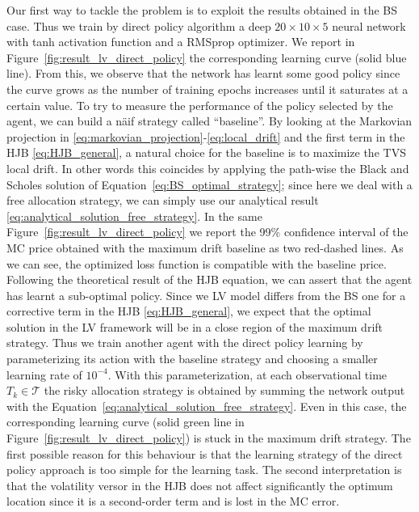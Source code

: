 \documentclass[11pt]{article}
\newcommand{\virgolette}[1]{``#1''}
\begin{document}
Our first way to tackle the problem is to exploit the results obtained in the BS case. Thus we train by direct policy algorithm a deep $20\times 10\times 5$ neural network with tanh activation function and a RMSprop optimizer. We report in Figure~\ref{fig:result_lv_direct_policy} the corresponding learning curve (solid blue line). From this, we observe that the network has learnt some good policy since the curve grows as the number of training epochs increases until it saturates at a certain value. To try to measure the performance of the policy selected by the agent, we can build a n\"aif strategy called \virgolette{baseline}. By looking at the Markovian projection in \eqref{eq:markovian_projection}-\eqref{eq:local_drift} and the first term in the HJB \eqref{eq:HJB_general}, a natural choice for the baseline is to maximize the TVS local drift. In other words this coincides by applying the path-wise the Black and Scholes solution of Equation~\eqref{eq:BS_optimal_strategy}; since here we deal with a free allocation strategy, we can simply use our analytical result \eqref{eq:analytical_solution_free_strategy}. In the same Figure~\ref{fig:result_lv_direct_policy} we report the 99\% confidence interval of the MC price obtained with the maximum drift baseline as two red-dashed lines. As we can see, the optimized loss function is compatible with the baseline price. Following the theoretical result of the HJB equation, we can assert that the agent has learnt a sub-optimal policy. Since we LV model differs from the BS one for a corrective term in the HJB \eqref{eq:HJB_general}, we expect that the optimal solution  in the LV framework will be in a close region of the maximum drift strategy. Thus we train another agent with the direct policy learning by parameterizing its action with the baseline strategy and choosing a smaller learning rate of $10^{-4}$. With this parameterization, at each observational time $T_k\in\mathcal{T}$ the risky allocation strategy is obtained by summing the network output with the Equation~\eqref{eq:analytical_solution_free_strategy}. Even in this case, the corresponding learning curve (solid green line in Figure~\ref{fig:result_lv_direct_policy}) is stuck in the maximum drift strategy. The first possible reason for this behaviour is that the learning strategy of the direct policy approach is too simple for the learning task. The second interpretation is that the volatility versor in the HJB does not affect significantly the optimum location since it is a second-order term and is lost in the MC error. 
\end{document}
